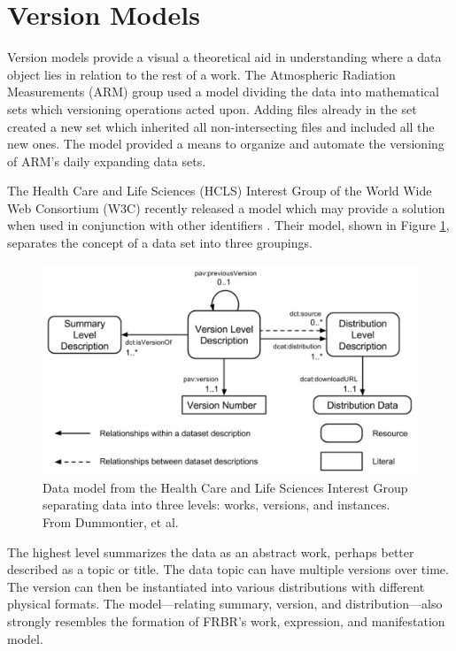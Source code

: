 \section{Version Models} \label{sec:models}

Version models provide a visual a theoretical aid in understanding where a data object lies in relation to the rest of a work.
The Atmospheric Radiation Measurements (ARM) group used a model dividing the data into mathematical sets which versioning operations acted upon\cite{6906868}.
Adding files already in the set created a new set which inherited all non-intersecting files and included all the new ones.
The model provided a means to organize and automate the versioning of ARM's daily expanding data sets.

The Health Care and Life Sciences (HCLS) Interest Group of the World Wide Web Consortium (W3C) recently released a model which may provide a solution when used in conjunction with other identifiers \cite{Dummontier2016}.
Their model, shown in Figure \ref{HCLSModel}, separates the concept of a data set into three groupings.
\begin{figure}%
	\centering
	\includegraphics[scale=0.35]{figures/HCLSModel.png}
	\caption[Data model from the Health Care and Life Sciences Interest Group separating data into three levels: works, versions, and instances.]{Data model from the Health Care and Life Sciences Interest Group separating data into three levels: works, versions, and instances.  From Dummontier, et al. \cite{Dummontier2016}}
	\label{HCLSModel}
\end{figure}
The highest level summarizes the data as an abstract work, perhaps better described as a topic or title.
The data topic can have multiple versions over time.
The version can then be instantiated into various distributions with different physical formats.
The model---relating summary, version, and distribution---also strongly resembles the formation of FRBR's work, expression, and manifestation model.

